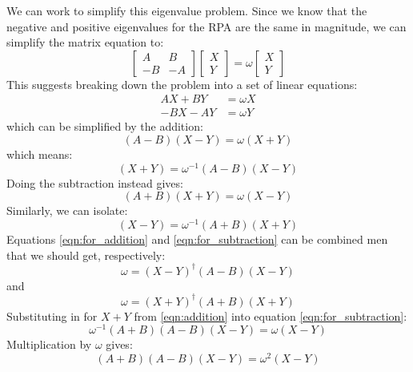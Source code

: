 \documentclass[12pt]{caltech_thesis}
\begin{document}
We can work to simplify this eigenvalue problem. Since we know that the negative and positive eigenvalues for the RPA are the same in magnitude, we can simplify the matrix equation to:
\begin{equation}
\begin{bmatrix}
A & B \\
-B & -A
\end{bmatrix}
\begin{bmatrix}
X \\
Y
\end{bmatrix}
= \omega
\begin{bmatrix}
X \\
Y
\end{bmatrix}
\end{equation}
This suggests breaking down the problem into a set of linear equations:
\begin{align}
    AX + BY &= \omega X\\
    -BX-AY &= \omega Y
\end{align}
which can be simplified by the addition:
\begin{equation}
    (A-B)(X-Y)= \omega (X+Y)
\label{eqn:for_addition}
\end{equation}
which means:
\begin{equation}
    (X+Y) = \omega^{-1}(A-B)(X-Y)
\label{eqn:addition}
\end{equation}
Doing the subtraction instead gives:
\begin{equation}
    (A+B)(X+Y)= \omega (X-Y)
\label{eqn:for_subtraction}
\end{equation}
Similarly, we can isolate:
\begin{equation}
    (X-Y) = \omega^{-1}(A+B)(X+Y)
\label{eqn:subtraction}
\end{equation}
Equations \ref{eqn:for_addition} and \ref{eqn:for_subtraction} can be combined men that we should get, respectively:
\begin{equation}
    \boxed{\omega = (X-Y)^{\dag} (A-B)(X-Y)}
\end{equation}
and
\begin{equation}
    \boxed{\omega = (X+Y)^{\dag} (A+B)(X+Y)}
\end{equation}
Substituting in for $X+Y$ from \ref{eqn:addition} into equation \ref{eqn:for_subtraction}:
\begin{equation}
    \omega^{-1}(A+B)(A-B)(X-Y) = \omega (X-Y)
\end{equation}
Multiplication by $\omega$ gives:
\begin{equation}
    (A+B)(A-B)(X-Y) = \omega^2 (X-Y)
\end{equation}
\end{document}
